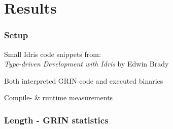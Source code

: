 \documentclass[bigger]{beamer}
\begin{document}
\section{Results}

\begin{frame}[fragile]
\frametitle{Setup}

	\vspace{1.5cm}
	\begin{vfitemize}
		\item Small Idris code snippets from: \\
		\textit{Type-driven Development with Idris} by Edwin Brady
		\item Both interpreted GRIN code and executed binaries
		\item Compile- \& runtime measurements
	\end{vfitemize}

	\vspace{-0.5cm}
	\begin{figure}[H]
		\centering
		\begin{adjustbox}{scale = 0.75}
			
		\end{adjustbox}
	\end{figure}

\end{frame}



\begin{frame}[fragile]
\frametitle{Length - GRIN statistics}

	\begin{figure}
		\hspace{-1cm}
		\begin{minipage}{0.45\textwidth}
		\end{minipage}
		\hspace{1cm}
		\begin{minipage}{0.45\textwidth}
		\end{minipage}
	\end{figure}

\end{frame}
\end{document}
